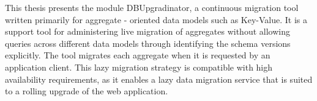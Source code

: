 This thesis presents the module DBUpgradinator, a continuous migration tool written primarily for aggregate - oriented data models such as Key-Value. It is a support tool for administering live migration of aggregates without allowing queries across different data models through identifying the schema versions explicitly. The tool migrates each aggregate when it is requested by an application client. This lazy migration strategy is compatible with high availability requirements, as it enables a lazy data migration service that is suited to a rolling upgrade of the web application.

\clearpage

